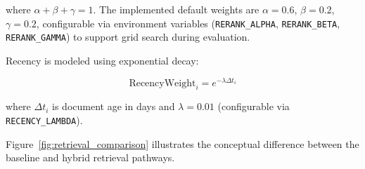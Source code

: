 \documentclass[12pt,a4paper]{report}
\begin{document}
where $\alpha + \beta + \gamma = 1$. The implemented default weights are $\alpha = 0.6$, $\beta = 0.2$, $\gamma = 0.2$, configurable via environment variables (\texttt{RERANK\_ALPHA}, \texttt{RERANK\_BETA}, \texttt{RERANK\_GAMMA}) to support grid search during evaluation.

Recency is modeled using exponential decay:

\begin{equation}
  \text{RecencyWeight}_i = e^{-\lambda \Delta t_i}
  \label{eq:recency}
\end{equation}

where $\Delta t_i$ is document age in days and $\lambda = 0.01$ (configurable via \texttt{RECENCY\_LAMBDA}).

Figure~\ref{fig:retrieval_comparison} illustrates the conceptual difference between the baseline and hybrid retrieval pathways.
\end{document}
